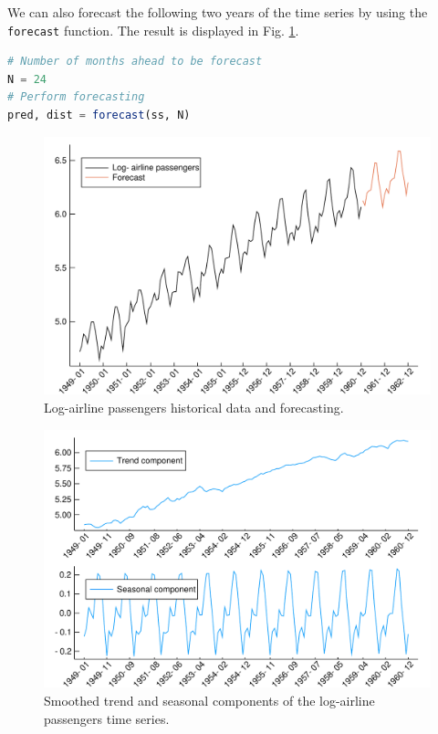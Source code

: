 \documentclass{juliacon}
\begin{document}
We can also forecast the following two years of the time series by using the \texttt{forecast} function. The result is displayed in Fig. \ref{fig:log_airline_forecast}.
%
\begin{lstlisting}[language = Julia]
# Number of months ahead to be forecast
N = 24
# Perform forecasting
pred, dist = forecast(ss, N)
\end{lstlisting}
%
\begin{figure}[h]
	\centering
	\includegraphics[width=\columnwidth]{Figures/log_airline_forecast.pdf}
	\caption{Log-airline passengers historical data and forecasting.}
	\label{fig:log_airline_forecast}
\end{figure}
%
\begin{figure}[h]
	\centering
	\includegraphics[width=\columnwidth]{Figures/log_airline_components.pdf}
	\caption{Smoothed trend and seasonal components of the log-airline passengers time series.}
	\label{fig:log_airline_components}
\end{figure}
\end{document}
